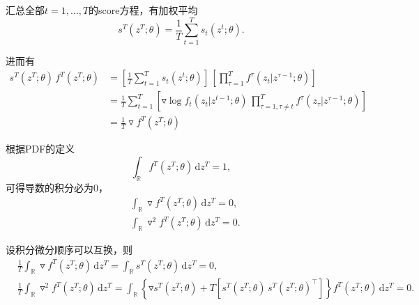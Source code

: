 汇总全部$t=1,\ldots,T$的score方程，有加权平均
\begin{equation}
    \label{eq:qlme-ime-def}
    s^{T} \left( z^{T}; \theta \right) = \frac{1}{T} \sum_{t=1}^{T} s_{t}  \left(z^{t}; \theta \right).
\end{equation}

进而有
\begin{equation*}
    \label{eq:qmle-ime-mid-equality}
    \begin{split}
        s^{T} \left(z^{T}; \theta \right) \, f^{T} \left(z^{T}; \theta \right) & =
        \left[
        \frac{1}{T} \sum_{t=1}^{T} s_{t} \left(z^{t}; \theta \right)
        \right] \,
        \left[
        \prod_{\tau=1}^{T} f^{\tau} \left(z_{t} | z^{\tau-1} ; \theta \right)
        \right] \\
        & = \frac{1}{T} \sum_{t=1}^{T}
        \left[
        \triangledown \log f_{t} \left(z_{t} | z^{t-1}; \theta \right) \,
        \prod_{\tau=1,\tau \neq t}^{T} f^{\tau} \left(z_{\tau} | z^{\tau - 1}; \theta \right)
        \right] \\
        & = \frac{1}{T} \triangledown f^{T} \left(z^{T}; \theta \right)
    \end{split}
\end{equation*}

根据PDF的定义
\begin{equation*}
    \int_{\mathbb{R}} f^{T} \left(z^{T}; \theta \right) \, \mathrm{d} z^{T} = 1,
\end{equation*}
可得导数的积分必为$0$，
\begin{align*}
    & \int_{\mathbb{R}} \triangledown f^{T} \left(z^{T}; \theta \right) \, \mathrm{d} z^{T} = 0, \\
    & \int_{\mathbb{R}} \triangledown^{2} f^{T} \left(z^{T}; \theta \right) \, \mathrm{d} z^{T} = 0.
\end{align*}

设积分微分顺序可以互换，则
\begin{align}
    \label{eq:qmle-ime-mid-int1}
    & \frac{1}{T} \int_{\mathbb{R}} \triangledown f^{T} \left( z^{T}; \theta \right) \, \mathrm{d} z^{T} = \int_{\mathbb{R}} s^{T} \left(z^{T}; \theta \right) \, \mathrm{d} z^{T} =0, \\
    \label{eq:qmle-ime-mid-int2}
    & \frac{1}{T} \int_{\mathbb{R}} \triangledown^{2} f^{T} \left(z^{T}; \theta \right) \, \mathrm{d} z^{T} = \int_{\mathbb{R}}
    \left\{
    \triangledown s^{T} \left( z^{T}; \theta \right)
    + T \left[
    s^{T} \left(z^{T} ; \theta \right) \, s^{T} \left(z^{T} ; \theta \right)^{\top}
    \right]
    \right\} f^{T} \left(z^{T}; \theta \right)
    \, \mathrm{d} z^{T} =0.
\end{align}

